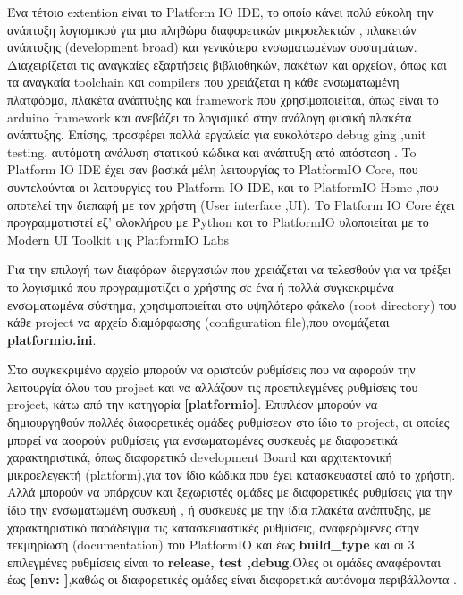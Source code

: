 \FloatBarrier    

Ένα τέτοιο extention είναι το Platform IO IDE, το οποίο κάνει πολύ εύκολη την ανάπτυξη λογισμικού για μια πληθώρα διαφορετικών μικροελεκτών , πλακετών ανάπτυξης (development broad) και γενικότερα ενσωματωμένων συστημάτων. Διαχειρίζεται τις αναγκαίες εξαρτήσεις βιβλιοθηκών, πακέτων και αρχείων, όπως και τα αναγκαία toolchain και compilers που χρειάζεται η κάθε ενσωματωμένη πλατφόρμα, πλακέτα ανάπτυξης και framework που χρησιμοποιείται, όπως είναι το arduino framework και ανεβάζει το λογισμικό στην ανάλογη φυσική πλακέτα ανάπτυξης.
Επίσης, προσφέρει πολλά εργαλεία για ευκολότερο debug ging   ,unit testing, αυτόματη ανάλυση στατικού κώδικα και ανάπτυξη από απόσταση \cite{PlatformIOINTRO}.
 To Platform IO IDE έχει σαν βασικά μέλη λειτουργίας το PlatformIO Core, που συντελούνται οι λειτουργίες του Platform IO IDE,   και το PlatformIO Home ,που αποτελεί την διεπαφή με τον χρήστη (User    interface  ,UI).
 Το Platform IO Core έχει προγραμματιστεί εξ' ολοκλήρου με Python και το PlatformIO υλοποιείται με το Modern UI Toolkit της PlatformIO Labs





Για την επιλογή των διαφόρων  διεργασιών που χρειάζεται να τελεσθούν για να τρέξει το λογισμικό που προγραμματίζει ο χρήστης σε ένα ή πολλά συγκεκριμένα ενσωματωμένα σύστημα, χρησιμοποιείται στο υψηλότερο φάκελο (root  directory) του κάθε project
   να αρχείο διαμόρφωσης (configuration file),που ονομάζεται \textbf{platformio.ini}. 

Στο συγκεκριμένο αρχείο μπορούν να οριστούν ρυθμίσεις που να αφορούν την λειτουργία όλου του project και να αλλάζουν τις προεπιλεγμένες ρυθμίσεις του project, κάτω από την κατηγορία  \textbf{[platformio]}.
Επιπλέον μπορούν να δημιουργηθούν πολλές διαφορετικές ομάδες ρυθμίσεων στο ίδιο το project, οι οποίες μπορεί να αφορούν ρυθμίσεις για ενσωματωμένες συσκευές με διαφορετικά χαρακτηριστικά, όπως διαφορετικό development Board και αρχιτεκτονική μικροελεγεκτή  (platform),για τον ίδιο κώδικα που έχει κατασκευαστεί από το χρήστη.
Αλλά  μπορούν να υπάρχουν και ξεχωριστές ομάδες με διαφορετικές ρυθμίσεις για την ίδιο την ενσωματωμένη συσκευή , 
ή συσκευές με την ίδια πλακέτα ανάπτυξης, με χαρακτηριστικό παράδειγμα τις κατασκευαστικές ρυθμίσεις, 
αναφερόμενες στην τεκμηρίωση (documentation) του PlatformIO και έως \textbf{build\_type  }  
και οι 3 επιλεγμένες ρυθμίσεις είναι το \textbf{release,  test   ,debug}.Όλες οι ομάδες αναφέρονται έως  \textbf{[env: ]},καθώς οι διαφορετικές ομάδες είναι διαφορετικά αυτόνομα περιβάλλοντα  \cite{PlatformIOCONFIG}.


